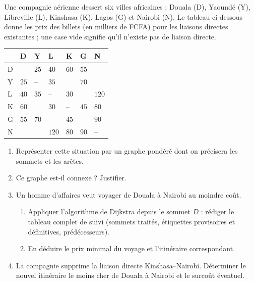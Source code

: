 \documentclass[11pt]{article}
\begin{document}
\begin{exercice}
Une compagnie aérienne dessert six villes africaines : Douala (D), Yaoundé (Y), Libreville (L), Kinshasa (K), Lagos (G) et Nairobi (N). Le tableau ci-dessous donne les prix des billets (en milliers de FCFA) pour les liaisons directes existantes ; une case vide signifie qu'il n'existe pas de liaison directe.
\begin{center}
\begin{tabularx}{\linewidth}{|l|X|X|X|X|X|X|}
\hline
\rowcolor{popblueL} & D & Y & L & K & G & N \\
\hline
D & -- & $25$ & $40$ & $60$ & $55$ & \\
\hline
Y & $25$ & -- & $35$ & & $70$ & \\
\hline
L & $40$ & $35$ & -- & $30$ & & $120$ \\
\hline
K & $60$ & & $30$ & -- & $45$ & $80$ \\
\hline
G & $55$ & $70$ & & $45$ & -- & $90$ \\
\hline
N & & & $120$ & $80$ & $90$ & -- \\
\hline
\end{tabularx}
\end{center}
\begin{enumerate}
\item Représenter cette situation par un graphe pondéré dont on précisera les sommets et les arêtes.
\item Ce graphe est-il connexe ? Justifier.
\item Un homme d'affaires veut voyager de Douala à Nairobi au moindre coût.
\begin{enumerate}
\item Appliquer l'algorithme de Dijkstra depuis le sommet $D$ : rédiger le tableau complet de suivi (sommets traités, étiquettes provisoires et définitives, prédécesseurs).
\item En déduire le prix minimal du voyage et l'itinéraire correspondant.
\end{enumerate}
\item La compagnie supprime la liaison directe Kinshasa--Nairobi. Déterminer le nouvel itinéraire le moins cher de Douala à Nairobi et le surcoût éventuel.
\end{enumerate}
\end{exercice}
\end{document}
